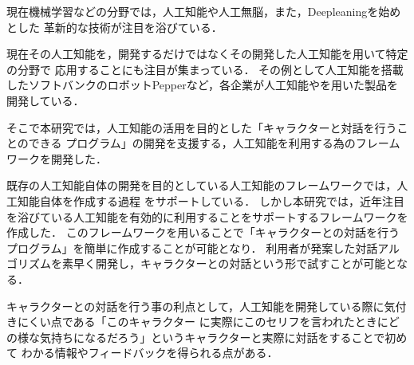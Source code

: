 %
現在機械学習などの分野では，人工知能や人工無脳，また，Deepleaningを始めとした
革新的な技術が注目を浴びている．

現在その人工知能を，開発するだけではなくその開発した人工知能を用いて特定の分野で
応用することにも注目が集まっている．
その例として人工知能を搭載したソフトバンクのロボットPepperなど，各企業が人工知能やを用いた製品を開発している．

そこで本研究では，人工知能の活用を目的とした「キャラクターと対話を行うことのできる
プログラム」の開発を支援する，人工知能を利用する為のフレームワークを開発した．

既存の人工知能自体の開発を目的としている人工知能のフレームワークでは，人工知能自体を作成する過程
をサポートしている．
しかし本研究では，近年注目を浴びている人工知能を有効的に利用することをサポートするフレームワークを作成した．
このフレームワークを用いることで「キャラクターとの対話を行うプログラム」を簡単に作成することが可能となり．
利用者が発案した対話アルゴリズムを素早く開発し，キャラクターとの対話という形で試すことが可能となる．

キャラクターとの対話を行う事の利点として，人工知能を開発している際に気付きにくい点である「このキャラクター
に実際にこのセリフを言われたときにどの様な気持ちになるだろう」というキャラクターと実際に対話をすることで初めて
わかる情報やフィードバックを得られる点がある．